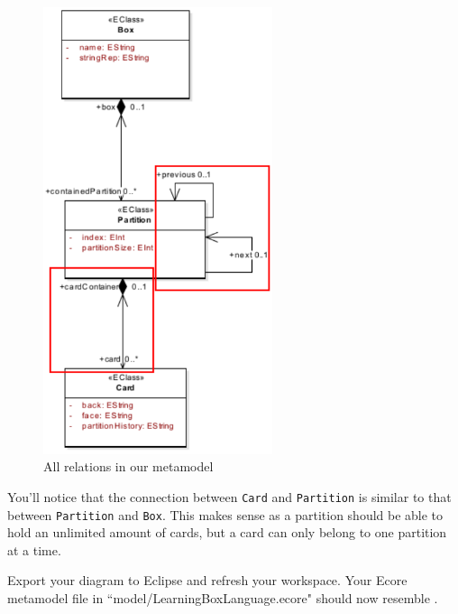 \begin{stepbystep}
\vspace{1cm}

\begin{figure}[htbp]
	\centering
  \includegraphics[width=0.6\textwidth]{../../org.moflon.doc.handbook.02_leitnersLearningBox/2_staticSemantics/3_connectingClasses/ccVisImages/ea_classAttributes}
	\caption{All relations in our metamodel}
	\label{ea:ereferences_all}
\end{figure}
\FloatBarrier

\vspace{1cm}

\item You'll notice that the connection between \texttt{Card} and \texttt{Partition} is similar to that between \texttt{Partition} and
\texttt{Box}. This makes sense as a partition should be able to hold an unlimited amount of cards, but a card can only belong to one partition at a time.

\vspace{1cm}

\item Export your diagram to Eclipse and refresh your workspace. Your Ecore metamodel file in ``model/LearningBoxLanguage.ecore" should now resemble .


\end{stepbystep}
